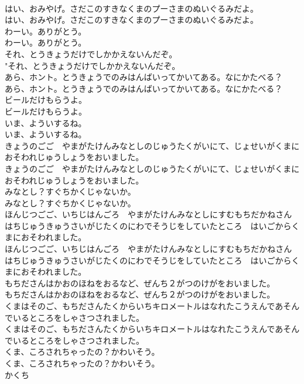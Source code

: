 \documentclass[8pt]{extreport}
\begin{document}
\begin{CJK}{UTF8}{min}
\\	はい、おみやげ。さだこのすきなくまのプーさまのぬいぐるみだよ。	
\\	はい、おみやげ。さだこのすきなくまのプーさまのぬいぐるみだよ。 
\\	わーい。ありがとう。	
\\	わーい。ありがとう。 
\\	それ、とうきょうだけでしかかえないんだぞ。	
\\	"それ、とうきょうだけでしかかえないんだぞ。 
\\	あら、ホント。とうきょうでのみはんばいってかいてある。なにかたべる？	
\\	あら、ホント。とうきょうでのみはんばいってかいてある。なにかたべる？ 
\\	ビールだけもらうよ。	
\\	ビールだけもらうよ。 
\\	いま、よういするね。	
\\	いま、よういするね。 
\\	きょうのごご　やまがたけんみなとしのじゅうたくがいにて、じょせいがくまにおそわれじゅうしょうをおいました。	
\\	きょうのごご　やまがたけんみなとしのじゅうたくがいにて、じょせいがくまにおそわれじゅうしょうをおいました。 
\\	みなとし？すぐちかくじゃないか。	
\\	みなとし？すぐちかくじゃないか。 
\\	ほんじつごご、いちじはんごろ　やまがたけんみなとしにすむもちだかねさんはちじゅうきゅうさいがじたくのにわでそうじをしていたところ　はいごからくまにおそわれました。	
\\	ほんじつごご、いちじはんごろ　やまがたけんみなとしにすむもちだかねさんはちじゅうきゅうさいがじたくのにわでそうじをしていたところ　はいごからくまにおそわれました。 
\\	もちださんはかおのほねをおるなど、ぜんち２がつのけがをおいました。	
\\	もちださんはかおのほねをおるなど、ぜんち２がつのけがをおいました。 
\\	くまはそのご、もちださんたくからいちキロメートルはなれたこうえんであそんでいるところをしゃさつされました。	
\\	くまはそのご、もちださんたくからいちキロメートルはなれたこうえんであそんでいるところをしゃさつされました。 
\\	くま、ころされちゃったの？かわいそう。	
\\	くま、ころされちゃったの？かわいそう。 
\\	かくち

\end{CJK}
\end{document}
